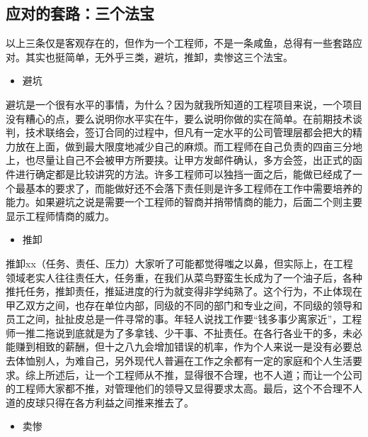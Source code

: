 \documentclass[]{book}
\providecommand{\tightlist}{%
  \setlength{\itemsep}{0pt}\setlength{\parskip}{0pt}}
\begin{document}
\hypertarget{ux5e94ux5bf9ux7684ux5957ux8defux4e09ux4e2aux6cd5ux5b9d}{%
\subsection{应对的套路：三个法宝}\label{ux5e94ux5bf9ux7684ux5957ux8defux4e09ux4e2aux6cd5ux5b9d}}

以上三条仅是客观存在的，但作为一个工程师，不是一条咸鱼，总得有一些套路应对。其实也挺简单，无外乎三类，避坑，推卸，卖惨这三个法宝。

\begin{itemize}
\tightlist
\item
  避坑
\end{itemize}

避坑是一个很有水平的事情，为什么？因为就我所知道的工程项目来说，一个项目没有糟心的点，要么说明你水平实在牛，要么说明你做的实在简单。在前期技术谈判，技术联络会，签订合同的过程中，但凡有一定水平的公司管理层都会把大的精力放在上面，做到最大限度地减少自己的麻烦。而工程师在自己负责的四亩三分地上，也尽量让自己不会被甲方所要挟。让甲方发邮件确认，多方会签，出正式的函件进行确定都是比较讲究的方法。许多工程师可以独挡一面之后，能做已经成了一个最基本的要求了，而能做好还不会落下责任则是许多工程师在工作中需要培养的能力。如果避坑之说是需要一个工程师的智商并捎带情商的能力，后面二个则主要显示工程师情商的威力。

\begin{itemize}
\tightlist
\item
  推卸
\end{itemize}

推卸xx（任务、责任、压力）大家听了可能都觉得嗤之以鼻，但实际上，在工程领域老实人往往责任大，任务重，在我们从菜鸟野蛮生长成为了一个油子后，各种推托任务，推卸责任，推延进度的行为就变得非学纯熟了。这个行为，不止体现在甲乙双方之间，也存在单位内部，同级的不同的部门和专业之间，不同级的领导和员工之间，扯扯皮总是一件寻常的事。年轻人说找工作要``钱多事少离家近''，工程师一推二拖说到底就是为了多拿钱、少干事、不扯责任。在各行各业干的多，未必能赚到相致的薪酬，但十之八九会增加错误的机率，作为个人来说一是没有必要总去体恤别人，为难自己，另外现代人普遍在工作之余都有一定的家庭和个人生活要求。综上所述后，让一个工程师从不推，显得很不合理，也不人道；而让一个公司的工程师大家都不推，对管理他们的领导又显得要求太高。最后，这个不合理不人道的皮球只得在各方利益之间推来推去了。

\begin{itemize}
\tightlist
\item
  卖惨
\end{itemize}
\end{document}
